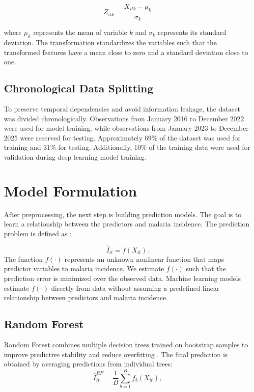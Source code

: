 \[
Z_{itk} = \frac{X_{itk} - \mu_k}{\sigma_k}
\]

where \(\mu_k\) represents the mean of variable \(k\) and \(\sigma_k\) represents its standard deviation. The transformation standardizes the variables such that the transformed features have a mean close to zero and a standard deviation close to one. 

\subsection{Chronological Data Splitting }
\label{sec:data_splitting}

To preserve temporal dependencies and avoid information leakage, the dataset was divided chronologically. Observations from January 2016 to December 2022 were used for model training, while observations from January 2023 to December 2025 were reserved for testing. Approximately 69\% of the dataset was used for training and 31\% for testing. Additionally, 10\% of the training data were used for validation during deep learning model training.


\section{Model Formulation}
\label{sec:model_formulation}

After preprocessing, the next step is building prediction models. The goal is to learn a relationship between the predictors and malaria incidence. The prediction problem is defined as \cite{Goodfellow-et-al-2016}:

\[
\hat{I}_{it} = f(X_{it}).
\]
The function \(f(\cdot)\) represents an unknown nonlinear function that maps predictor variables to malaria incidence. We estimate \(f(\cdot)\) such that the prediction error is minimized over the observed data. Machine learning models estimate \(f(\cdot)\) directly from data without assuming a predefined linear relationship between predictors and malaria incidence.

\subsection{Random Forest}
Random Forest combines multiple decision trees trained on bootstrap samples to improve predictive stability and reduce overfitting \cite{Egbuna2025}. The final prediction is obtained by averaging predictions from individual trees:
\[
\hat{I}_{it}^{RF} = \frac{1}{B} \sum_{b=1}^{B} f_b(X_{it}),
\]

